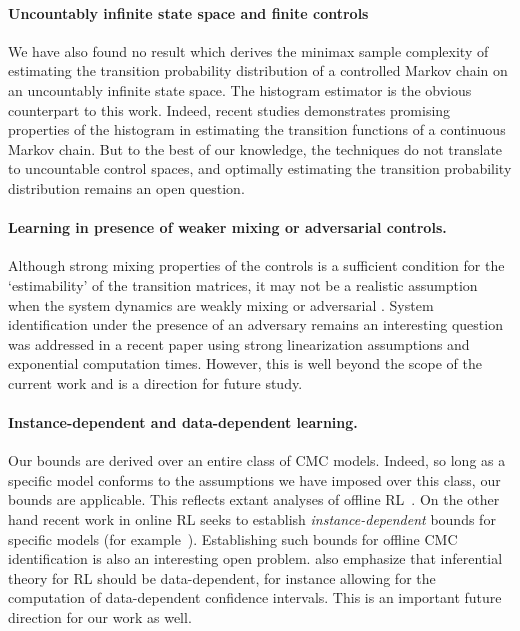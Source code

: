 \documentclass[opre,sglanonrev]{informs4}
\numberwithin{equation}{section}
\begin{document}
\paragraph{Uncountably infinite state space and finite controls} We have also found no result which derives the minimax sample complexity of estimating the transition probability distribution of a controlled Markov chain on an uncountably infinite state space. The histogram estimator is the obvious counterpart to this work. Indeed, recent studies \citep{sart2014estimation,loffler2021spectral} demonstrates promising properties of the histogram in estimating the transition functions of a continuous Markov chain. But to the best of our knowledge, the techniques do not translate to uncountable control spaces, and optimally estimating the transition probability distribution remains an open question. %

\paragraph{Learning in presence of weaker mixing or adversarial controls.} Although strong mixing properties of the controls is a sufficient condition for the `estimability' of the transition matrices, it may not be a realistic assumption when the system dynamics are weakly mixing or adversarial \citep{pinto2017robust}. %
System identification under the presence of an adversary remains an interesting question %
was addressed in a recent paper \citep{showkatbakhsh2016system} using strong linearization assumptions and exponential computation times. However, this is well beyond the scope of the current work and is a direction for future study.  

{\paragraph{Instance-dependent and data-dependent learning.} Our bounds are derived over an entire class of CMC models. Indeed, so long as a specific model conforms to the assumptions we have imposed over this class, our bounds are applicable. This reflects extant analyses of offline RL~\citep{li2022settling,li2022settlingh}. On the other hand recent work in online RL seeks to establish \emph{instance-dependent} bounds for specific models  (for example~\cite{zanette2019tighter,mou2021optimal,khamaru2022instance}). Establishing such bounds for offline CMC identification is also an interesting open problem. 
\cite{khamaru2022instance} also emphasize that inferential theory for RL should be data-dependent, for instance allowing for the computation of data-dependent confidence intervals. This is an important future direction for our work as well.}
\end{document}
